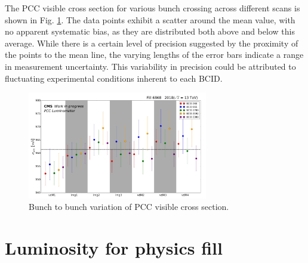 The PCC visible cross section for various bunch crossing across different scans is shown in Fig. \ref{fig:sigmavis_btob_variation}. The data points exhibit a scatter around the mean value, with no apparent systematic bias, as they are distributed both above and below this average. While there is a certain level of precision suggested by the proximity of the points to the mean line, the varying lengths of the error bars indicate a range in measurement uncertainty. This variability in precision could be attributed to fluctuating experimental conditions inherent to each BCID. %

\begin{figure}[!htp]
\centering
\includegraphics[width=0.7\textwidth]{ashish_thesis/sigma_vis_btob_var_1.png}
\caption[$\sigma_{vis}$ bunch variation]{%
 Bunch to bunch variation of PCC visible cross section.
}
\label{fig:sigmavis_btob_variation}
\end{figure}

\newpage
\section{Luminosity for physics fill}


